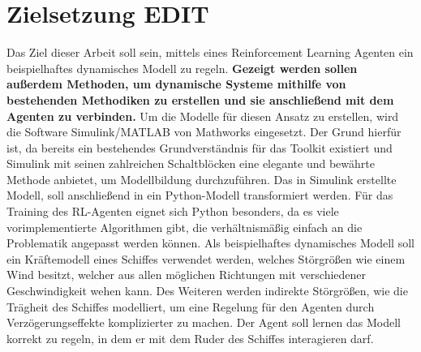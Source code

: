 \documentclass[]{iat}
\begin{document}
\section{Zielsetzung EDIT} \label{sec:zielsetzung}
Das Ziel dieser Arbeit soll sein, mittels eines Reinforcement Learning Agenten ein beispielhaftes dynamisches Modell zu regeln. \textbf{Gezeigt werden sollen außerdem Methoden, um dynamische Systeme mithilfe von bestehenden Methodiken zu erstellen und sie anschließend mit dem Agenten zu verbinden.} Um die Modelle für diesen Ansatz zu erstellen, wird die Software Simulink/MATLAB von Mathworks eingesetzt. \cite[]{simulink} Der Grund hierfür ist, da bereits ein bestehendes Grundverständnis für das Toolkit existiert und Simulink mit seinen zahlreichen Schaltblöcken eine elegante und bewährte Methode anbietet, um Modellbildung durchzuführen. Das in Simulink erstellte Modell, soll anschließend in ein Python-Modell transformiert werden. Für das Training des RL-Agenten eignet sich Python \cite[]{python} besonders, da es viele vorimplementierte Algorithmen gibt, die verhältnismäßig einfach an die Problematik angepasst werden können. Als beispielhaftes dynamisches Modell soll ein Kräftemodell eines Schiffes verwendet werden, welches Störgrößen wie einem Wind besitzt, welcher aus allen möglichen Richtungen mit verschiedener Geschwindigkeit wehen kann. Des Weiteren werden indirekte Störgrößen, wie die Trägheit des Schiffes modelliert, um eine Regelung für den Agenten durch Verzögerungseffekte komplizierter zu machen. Der Agent soll lernen das Modell korrekt zu regeln, in dem er mit dem Ruder des Schiffes interagieren darf.
\end{document}
